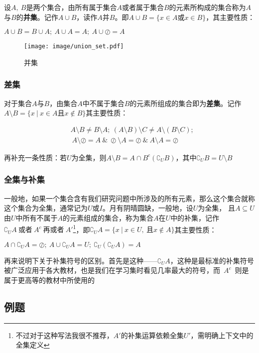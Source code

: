 设$A,~B$是两个集合，由所有属于集合$A$或者属于集合$B$的元素所构成的集合称为$A$与$B$的\textbf{并集}。记作$A\cup{}B$，读作$A$并$B$。即$A\cup{}B=\{x \in A \text{或} x \in B\}$，其主要性质：

$A\cup{}B=B\cup{}A;~A\cup{}A=A;~A\cup{}\oslash = A$

\begin{figure}[ht]
     \flushright
     \texttt{[image: image/union\_set.pdf]}
     \captionsetup{justification=raggedleft,singlelinecheck=false}
     \caption{\small{并集}}
\end{figure}

\subsubsection{差集}

对于集合$A \text{与} B$，由集合$A$中不属于集合$B$的元素所组成的集合即为\textbf{差集}。记作$A \setminus B = \{x~|~x \in A \text{且} x \notin B\}$其主要性质：

\begin{equation*}
    \begin{aligned}
        & A \setminus B \ne B \setminus A;~(A \setminus B)\setminus C \ne A \setminus (B \setminus C); \\
        & ~A \setminus \oslash = A~\&~\oslash \setminus A = \oslash~\&~ A \setminus A = \oslash
    \end{aligned}
\end{equation*}

再补充一条性质：若$U$为全集，则$A \setminus B = A \cap B^c (\complement_{U}B)$，其中$\complement_{U}B=U \setminus B$

\subsubsection{全集与补集}

一般地，如果一个集合含有我们研究问题中所涉及的所有元素，那么这个集合就称这个集合为全集，通常记为$U$或$I$。月有阴晴圆缺，一般地，设$U$为全集，
且$A \subseteq U$由$U$中所有不属于$A$的元素组成的集合，称为集合$A$在$U$中的补集，记作$\complement_{U}A~\text{或者}~A^c~\text{再或者}~A'$\footnote{不过对于这种写法我很不推荐，$A'$的补集运算依赖全集$U'$，需明确上下文中的全集定义}，即$\complement_{U}A=\{x~|~x \in U,~\text{且}x \notin A\}$其主要性质：

$A \cap \complement_{U}A = \oslash;~A \cup \complement_{U}A = U;~\complement_{U}(\complement_{U}A)=A$

再来说明下关于补集符号的区别。首先是这种——$\complement_{U}A$，这种是最标准的补集符号被广泛应用于各大教材，也是我们在学习集时看见几率最大的符号，而~$A^c$~则是属于更高等的教材中所使用的

\subsection{例题}
